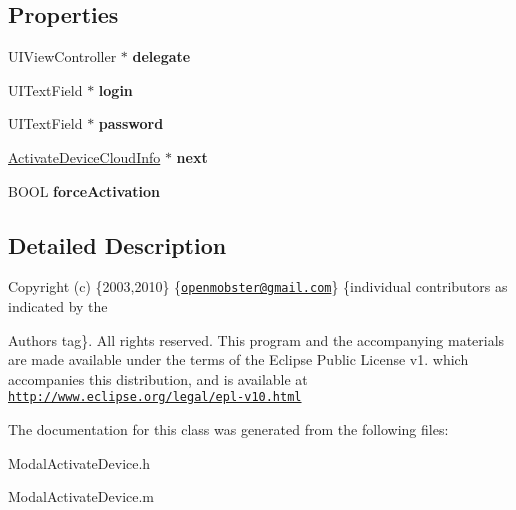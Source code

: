 \subsection*{\-Properties}
\begin{DoxyCompactItemize}
\item 
\hypertarget{interface_modal_activate_device_a36d08e216273a4945612ab255a219c09}{
\-U\-I\-View\-Controller $\ast$ {\bfseries delegate}}
\label{interface_modal_activate_device_a36d08e216273a4945612ab255a219c09}

\item 
\hypertarget{interface_modal_activate_device_a909df9850b143a3b14c54c16ae45ca60}{
\-U\-I\-Text\-Field $\ast$ {\bfseries login}}
\label{interface_modal_activate_device_a909df9850b143a3b14c54c16ae45ca60}

\item 
\hypertarget{interface_modal_activate_device_aaf0bb5384eb5a0f7e646bfcb63ef16c4}{
\-U\-I\-Text\-Field $\ast$ {\bfseries password}}
\label{interface_modal_activate_device_aaf0bb5384eb5a0f7e646bfcb63ef16c4}

\item 
\hypertarget{interface_modal_activate_device_a9bd94759994e7438c4938020a2dc9f5f}{
\hyperlink{interface_activate_device_cloud_info}{\-Activate\-Device\-Cloud\-Info} $\ast$ {\bfseries next}}
\label{interface_modal_activate_device_a9bd94759994e7438c4938020a2dc9f5f}

\item 
\hypertarget{interface_modal_activate_device_ae64c63dc7e50646071a7222f918f7608}{
\-B\-O\-O\-L {\bfseries force\-Activation}}
\label{interface_modal_activate_device_ae64c63dc7e50646071a7222f918f7608}

\end{DoxyCompactItemize}


\subsection{\-Detailed \-Description}
\-Copyright (c) \{2003,2010\} \{\href{mailto:openmobster@gmail.com}{\tt openmobster@gmail.\-com}\} \{individual contributors as indicated by the \begin{DoxyAuthor}{\-Authors}
tag\}. \-All rights reserved. \-This program and the accompanying materials are made available under the terms of the \-Eclipse \-Public \-License v1. which accompanies this distribution, and is available at \href{http://www.eclipse.org/legal/epl-v10.html}{\tt http\-://www.\-eclipse.\-org/legal/epl-\/v10.\-html} 
\end{DoxyAuthor}


\-The documentation for this class was generated from the following files\-:\begin{DoxyCompactItemize}
\item 
\-Modal\-Activate\-Device.\-h\item 
\-Modal\-Activate\-Device.\-m\end{DoxyCompactItemize}
